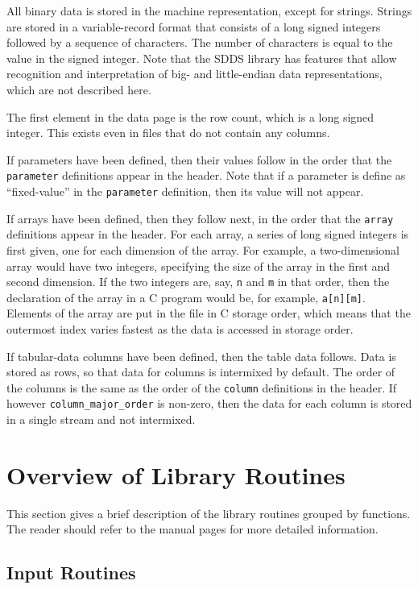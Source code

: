 \documentclass[11pt]{article}
\begin{document}
All binary data is stored in the machine representation, except for
strings.  Strings are stored in a variable-record format that consists
of a long signed integers followed by a sequence of characters.  The number
of characters is equal to the value in the signed integer.  Note that
the SDDS library has features that allow recognition and interpretation
of big- and little-endian data representations, which are not described here.

The first element in the data page is the row count, which is a long
signed integer.  This exists even in files that do not contain any
columns.

If parameters have been defined, then their values follow in the order
that the {\tt parameter} definitions appear in the header.  Note that
if a parameter is define as ``fixed-value'' in the {\tt parameter}
definition, then its value will not appear.

If arrays have been defined, then they follow next, in the order that
the {\tt array} definitions appear in the header.  For each array, a
series of long signed integers is first given, one for each dimension
of the array.  For example, a two-dimensional array would have two
integers, specifying the size of the array in the first and second
dimension.  If the two integers are, say, {\tt n} and {\tt m} in that
order, then the declaration of the array in a C program would be, for
example, {\tt a[n][m]}.  Elements of the array are put in the file in
C storage order, which means that the outermost index varies fastest
as the data is accessed in storage order.

If tabular-data columns have been defined, then the table data follows.
Data is stored as rows, so that data for columns is intermixed by default.  The
order of the columns is the same as the order of the {\tt column} definitions
in the header. If however {\tt column\_major\_order} is non-zero, then the 
data for each column is stored in a single stream and not intermixed.

\section{Overview of Library Routines}
This section gives a brief description of the library routines grouped by functions. The reader should refer to the manual pages for more detailed information. 
\subsection{Input Routines}
\end{document}
